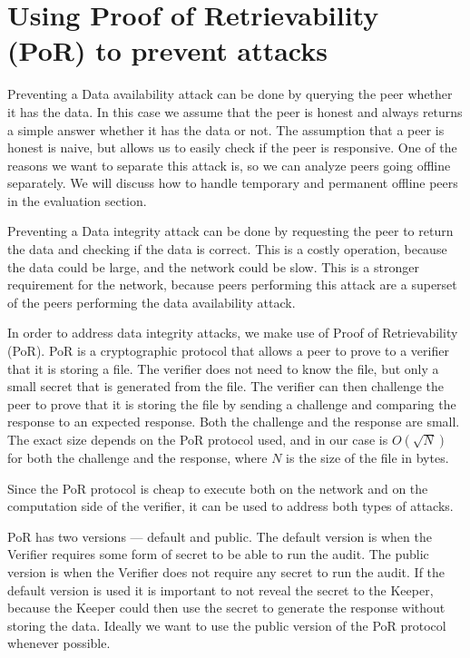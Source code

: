 \section{Using Proof of Retrievability (PoR) to prevent attacks}

Preventing a Data availability attack can be done by querying the peer whether it has the data.
In this case we assume that the peer is honest and always returns a simple answer whether it has the data or not.
The assumption that a peer is honest is naive, but allows us to easily check if the peer is responsive.
One of the reasons we want to separate this attack is, so we can analyze peers going offline separately.
We will discuss how to handle temporary and permanent offline peers in the evaluation section.

Preventing a Data integrity attack can be done by requesting the peer to return the data and checking if
the data is correct.
This is a costly operation, because the data could be large, and the network could be slow.
This is a stronger requirement for the network, because peers performing this attack are a superset
of the peers performing the data availability attack.

In order to address data integrity attacks, we make use of Proof of Retrievability (PoR).
PoR is a cryptographic protocol that allows a peer to prove to a verifier that it is storing a file.
The verifier does not need to know the file, but only a small secret that is generated from the file.
The verifier can then challenge the peer to prove that it is storing the file by sending a challenge and
comparing the response to an expected response.
Both the challenge and the response are small.
The exact size depends on the PoR protocol used, and in our case is $O(\sqrt{N})$ \cite{poralgebra} for
both the challenge and the response, where $N$ is the size of the file in bytes.

Since the PoR protocol is cheap to execute both on the network and on the computation side of the verifier,
it can be used to address both types of attacks.

PoR has two versions --- default and public.
The default version is when the Verifier requires some form of secret to be able to run the audit.
The public version is when the Verifier does not require any secret to run the audit.
If the default version is used it is important to not reveal the secret to the Keeper,
because the Keeper could then use the secret to generate the response without storing the data.
Ideally we want to use the public version of the PoR protocol whenever possible.

